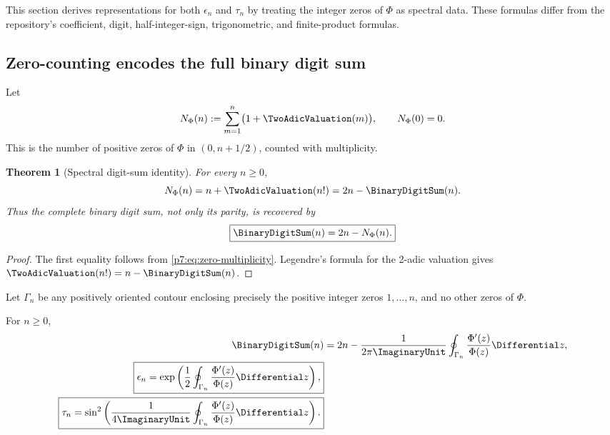 \documentclass[11pt]{article}
\newtheorem{theorem}{Theorem}[section]
\theoremstyle{definition}
\theoremstyle{remark}
\begin{document}
This section derives representations for both \(\epsilon_n\) and \(\tau_n\) by treating the
integer zeros of \(\Phi\) as spectral data. These formulas differ from the repository's
coefficient, digit, half-integer-sign, trigonometric, and finite-product formulas.

\subsection{Zero-counting encodes the full binary digit sum}

Let
\begin{equation}
 N_\Phi(n):=\sum_{m=1}^{n}\bigl(1+\TwoAdicValuation(m)\bigr),\qquad N_\Phi(0)=0.
 \label{p7:eq:Nphi-def}
\end{equation}
This is the number of positive zeros of \(\Phi\) in \((0,n+1/2)\), counted with multiplicity.

\begin{theorem}[Spectral digit-sum identity]
\label{p7:thm:spectral-digit-sum}
For every \(n\ge0\),
\begin{equation}
 N_\Phi(n)=n+\TwoAdicValuation(n!)=2n-\BinaryDigitSum(n).
 \label{p7:eq:Nphi-digit}
\end{equation}
Thus the complete binary digit sum, not only its parity, is recovered by
\begin{equation}
 \boxed{\displaystyle \BinaryDigitSum(n)=2n-N_\Phi(n).}
 \label{p7:eq:digit-from-spectrum}
\end{equation}
\end{theorem}

\begin{proof}
The first equality follows from \eqref{p7:eq:zero-multiplicity}. Legendre's formula for the
2-adic valuation gives \(\TwoAdicValuation(n!)=n-\BinaryDigitSum(n)\).
\end{proof}

Let \(\Gamma_n\) be any positively oriented contour enclosing precisely the positive integer
zeros \(1,\ldots,n\), and no other zeros of \(\Phi\).

\begin{corollary}
\label{p7:cor:argument-TM}
For \(n\ge0\),
\begin{align}
 \BinaryDigitSum(n)
 &=2n-\frac{1}{2\pi\ImaginaryUnit}\oint_{\Gamma_n}\frac{\Phi'(z)}{\Phi(z)}\Differential z,
 \label{p7:eq:digit-contour}\\
 \boxed{\displaystyle
 \epsilon_n=\exp\left(\frac12\oint_{\Gamma_n}
 \frac{\Phi'(z)}{\Phi(z)}\Differential z\right),}
 \label{p7:eq:epsilon-contour}\\
 \boxed{\displaystyle
 \tau_n=\sin^2\left(\frac{1}{4\ImaginaryUnit}\oint_{\Gamma_n}
 \frac{\Phi'(z)}{\Phi(z)}\Differential z\right).}
 \label{p7:eq:tau-contour}
\end{align}
\end{corollary}
\end{document}
